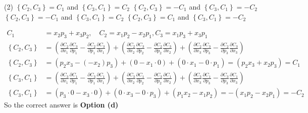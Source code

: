 \begin{enumerate}
 \begin{tasks}(2)
	\task[\textbf{a.}]$\left\{C_{2}, C_{3}\right\}=C_{1}$ and $\left\{C_{3}, C_{1}\right\}=C_{2}$
	\task[\textbf{b.}] $\left\{C_{2}, C_{3}\right\}=-C_{1}$ and $\left\{C_{3}, C_{1}\right\}=-C_{2}$
	\task[\textbf{c.}] $\left\{C_{2}, C_{3}\right\}=-C_{1}$ and $\left\{C_{3}, C_{1}\right\}=C_{2}$
	\task[\textbf{d.}] $\left\{C_{2}, C_{3}\right\}=C_{1}$ and $\left\{C_{3}, C_{1}\right\}=-C_{2}$
\end{tasks}
\begin{answer}
	$$
	\begin{aligned}
	C_{1}&=x_{2} p_{3}+x_{3} p_{2}, \quad C_{2}=x_{1} p_{2}-x_{2} p_{1}, C_{3}=x_{1} p_{3}+x_{3} p_{1}\\
	\left\{C_{2}, C_{3}\right\}&=\left(\frac{\partial C_{2}}{\partial x_{1}} \frac{\partial C_{3}}{\partial p_{1}}-\frac{\partial C_{2}}{\partial p_{1}} \frac{\partial C_{3}}{\partial x_{1}}\right)+\left(\frac{\partial C_{2}}{\partial x_{2}} \frac{\partial C_{3}}{\partial p_{2}}-\frac{\partial C_{2}}{\partial p_{2}} \frac{\partial C_{3}}{\partial x_{2}}\right)+\left(\frac{\partial C_{2}}{\partial x_{3}} \frac{\partial C_{3}}{\partial p_{3}}-\frac{\partial C_{2}}{\partial p_{3}} \frac{\partial C_{3}}{\partial x_{3}}\right) \\
	\left\{C_{2}, C_{3}\right\}&=\left(p_{2} x_{3}-\left(-x_{2}\right) p_{3}\right)+\left(0-x_{1} \cdot 0\right)+\left(0 \cdot x_{1}-0 \cdot p_{1}\right)=\left(p_{2} x_{3}+x_{2} p_{3}\right)=C_{1}\\
	\left\{C_{3}, C_{1}\right\}&=\left(\frac{\partial C_{3}}{\partial x_{1}} \frac{\partial C_{1}}{\partial p_{1}}-\frac{\partial C_{3}}{\partial p_{1}} \frac{\partial C_{1}}{\partial x_{1}}\right)+\left(\frac{\partial C_{3}}{\partial x_{2}} \frac{\partial C_{1}}{\partial p_{2}}-\frac{\partial C_{3}}{\partial p_{2}} \frac{\partial C_{1}}{\partial x_{2}}\right)+\left(\frac{\partial C_{3}}{\partial x_{3}} \frac{\partial C_{1}}{\partial p_{3}}-\frac{\partial C_{3}}{\partial p_{3}} \frac{\partial C_{1}}{\partial x_{3}}\right) \\
	\left\{C_{3}, C_{1}\right\}&=\left(p_{3} \cdot 0-x_{3} \cdot 0\right)+\left(0 \cdot x_{3}-0 \cdot p_{3}\right)+\left(p_{1} x_{2}-x_{1} p_{2}\right)=-\left(x_{1} p_{2}-x_{2} p_{1}\right)=-C_{2}
\end{aligned}
$$
So the correct answer is \textbf{Option (d)}
\end{answer}
\end{enumerate}